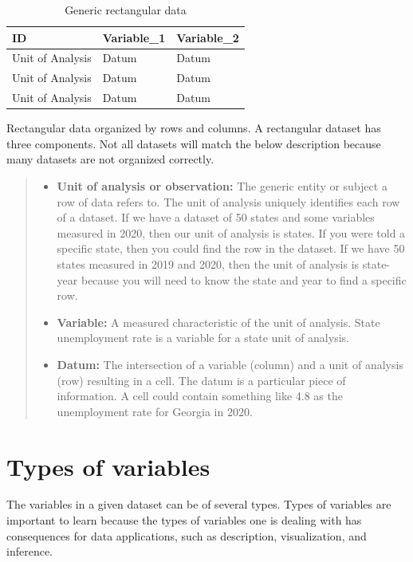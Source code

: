 \documentclass[
]{book}
\providecommand{\tightlist}{%
  \setlength{\itemsep}{0pt}\setlength{\parskip}{0pt}}
\begin{document}
\begin{table}

\caption{\label{tab:print-generic}Generic rectangular data}
\centering
\begin{tabular}[t]{l|l|l}
\hline
ID & Variable\_1 & Variable\_2\\
\hline
Unit of Analysis & Datum & Datum\\
\hline
Unit of Analysis & Datum & Datum\\
\hline
Unit of Analysis & Datum & Datum\\
\hline
\end{tabular}
\end{table}

Rectangular data organized by rows and columns. A rectangular dataset has three components. Not all datasets will match the below description because many datasets are not organized correctly.

\begin{quote}
\begin{itemize}
\tightlist
\item
  \textbf{Unit of analysis or observation:} The generic entity or subject a row of data refers to. The unit of analysis uniquely identifies each row of a dataset. If we have a dataset of 50 states and some variables measured in 2020, then our unit of analysis is states. If you were told a specific state, then you could find the row in the dataset. If we have 50 states measured in 2019 and 2020, then the unit of analysis is state-year because you will need to know the state and year to find a specific row.
\item
  \textbf{Variable:} A measured characteristic of the unit of analysis. State unemployment rate is a variable for a state unit of analysis.
\item
  \textbf{Datum:} The intersection of a variable (column) and a unit of analysis (row) resulting in a cell. The datum is a particular piece of information. A cell could contain something like 4.8 as the unemployment rate for Georgia in 2020.
\end{itemize}
\end{quote}

\hypertarget{types-of-variables}{%
\section{Types of variables}\label{types-of-variables}}

The variables in a given dataset can be of several types. Types of variables are important to learn because the types of variables one is dealing with has consequences for data applications, such as description, visualization, and inference.
\end{document}
